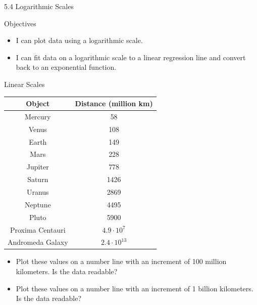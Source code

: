 \documentclass[ignorenonframetext,]{beamer}
\providecommand{\tightlist}{%
  \setlength{\itemsep}{0pt}\setlength{\parskip}{0pt}}
\begin{document}
\begin{frame}{5.4 Logarithmic Scales}

Objectives
\begin{itemize}
\item I can plot data using a logarithmic scale.
\item I can fit data on a logarithmic scale to a linear regression line and convert back to an exponential function.
\end{itemize}

\end{frame}

\begin{frame}{Linear Scales}

\begin{tabular}{c|c}
Object & Distance (million km) \\ \hline
Mercury & 58 \\
Venus & 108 \\
Earth & 149 \\
Mars & 228 \\
Jupiter & 778 \\
Saturn & 1426 \\
Uranus & 2869 \\
Neptune & 4495 \\
Pluto & 5900 \\
Proxima Centauri & $4.9 \cdot 10^7$ \\
Andromeda Galaxy & $2.4 \cdot 10^13$ \\
\end{tabular}

\begin{itemize}
\tightlist
\item
  Plot these values on a number line with an increment of 100 million
  kilometers. Is the data readable?
\item
  Plot these values on a number line with an increment of 1 billion
  kilometers. Is the data readable?
\end{itemize}

\end{frame}
\end{document}
